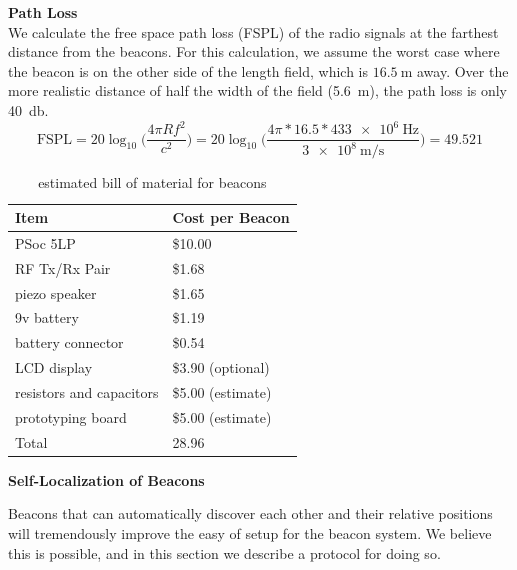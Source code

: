 \documentclass{article}
\begin{document}
      \textbf{Path Loss} \\
      We calculate the free space path loss (FSPL) of the radio signals at the farthest distance from the beacons. For this calculation, we assume the worst case where the beacon is on the other side of the length field, which is $\SI{16.5}{\meter}$ away. Over the more realistic distance of half the width of the field (\SI{5.6}{\meter}), the path loss is only \SI{40}{\decibel}. \\
      $$ \text{FSPL} = 20\log_{10}\Bigg(\frac{4\pi Rf^2}{c^2}\Bigg) = 20\log_{10}\Bigg(\frac{4\pi*16.5*\SI{433e6}{\hertz}}{\SI{3e8}{\meter\per\second}}\Bigg) = 49.521 $$

      \begin{table}
        \label{table:beacon_bom}
        \begin{tabular}{|l|l|}
          \hline
          Item & Cost per Beacon \\
          \hline
          PSoc 5LP & \$10.00 \\
          RF Tx/Rx Pair & \$1.68 \\
          piezo speaker & \$1.65 \\
          9v battery & \$1.19 \\
          battery connector & \$0.54 \\
          LCD display & \$3.90 (optional) \\
          resistors and capacitors & \$5.00 (estimate) \\
          prototyping board & \$5.00 (estimate) \\
          \hline
          Total & 28.96 \\
          \hline
        \end{tabular}
        \caption{estimated bill of material for beacons}
      \end{table}

      \textbf{Self-Localization of Beacons} \label{section:beacon_self_localization}

      Beacons that can automatically discover each other and their relative positions will tremendously improve the easy of setup for the beacon system. We believe this is possible, and in this section we describe a protocol for doing so.
\end{document}
